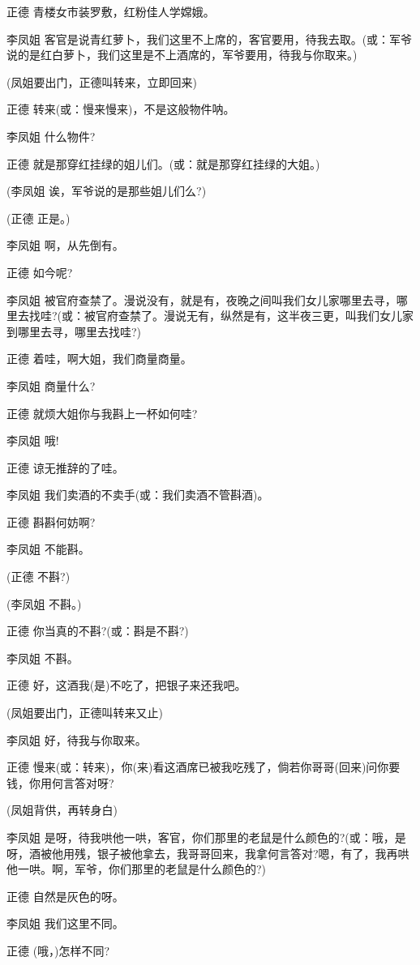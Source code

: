 正德 青楼女市装罗敷，红粉佳人学嫦娥。

李凤姐
客官是说青红萝卜，我们这里不上席的，客官要用，待我去取。(或：军爷说的是红白萝卜，我们这里是不上酒席的，军爷要用，待我与你取来。)

(凤姐要出门，正德叫转来，立即回来)

正德 转来(或：慢来慢来)，不是这般物件呐。

李凤姐 什么物件?

正德 就是那穿红挂绿的姐儿们。(或：就是那穿红挂绿的大姐。)

(李凤姐 诶，军爷说的是那些姐儿们么?)

(正德 正是。)

李凤姐 啊，从先倒有。

正德 如今呢?

李凤姐
被官府查禁了。漫说没有，就是有，夜晚之间叫我们女儿家哪里去寻，哪里去找哇?(或：被官府查禁了。漫说无有，纵然是有，这半夜三更，叫我们女儿家到哪里去寻，哪里去找哇?)

正德 着哇，啊大姐，我们商量商量。

李凤姐 商量什么?

正德 就烦大姐你与我斟上一杯如何哇?

李凤姐 哦!

正德 谅无推辞的了哇。

李凤姐 我们卖酒的不卖手(或：我们卖酒不管斟酒)。

正德 斟斟何妨啊?

李凤姐 不能斟。

(正德 不斟?)

(李凤姐 不斟。)

正德 你当真的不斟?(或：斟是不斟?)

李凤姐 不斟。

正德 好，这酒我(是)不吃了，把银子来还我吧。

(凤姐要出门，正德叫转来又止)

李凤姐 好，待我与你取来。

正德
慢来(或：转来)，你(来)看这酒席已被我吃残了，倘若你哥哥(回来)问你要钱，你用何言答对呀?

(凤姐背供，再转身白)

李凤姐
是呀，待我哄他一哄，客官，你们那里的老鼠是什么颜色的?(或：哦，是呀，酒被他用残，银子被他拿去，我哥哥回来，我拿何言答对?嗯，有了，我再哄他一哄。啊，军爷，你们那里的老鼠是什么颜色的?)

正德 自然是灰色的呀。

李凤姐 我们这里不同。

正德 (哦，)怎样不同?

